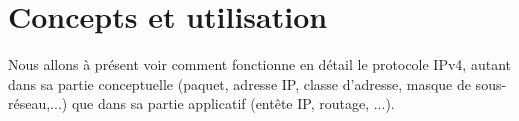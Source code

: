 
\section{Concepts et utilisation}

Nous allons à présent voir comment fonctionne en détail le protocole IPv4,
autant dans sa partie conceptuelle (paquet, adresse IP, classe d'adresse,
masque de sous-réseau,...) que dans sa partie applicatif (entête IP, routage,
...).




